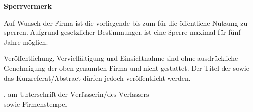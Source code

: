 \thispagestyle{empty}
{\LARGE\bfseries Sperrvermerk}

\vspace{5mm}

Auf Wunsch der Firma \mycompany{} ist die vorliegende \mykindofthesis{} bis zum \myblockinguntil{} für die öffentliche Nutzung zu sperren. Aufgrund gesetzlicher Bestimmungen ist eine Sperre maximal für fünf Jahre möglich. 

\vspace{5mm}

Veröffentlichung, Vervielfältigung und Einsichtnahme sind ohne ausdrückliche Genehmigung der oben genannten Firma und \myauthor{} nicht gestattet. Der Titel der \mykindofthesis{} sowie das Kurzreferat/Abstract dürfen jedoch veröffentlicht werden.

\vspace*{50mm}

\mysubmissiontown, am \mysubmissionday{} \mysubmissionmonth{} \mysubmissionyear{}\hfill$\overline{\mbox{Unterschrift der Verfasserin/des Verfassers}}$\\
\hspace*{10cm} sowie Firmenstempel